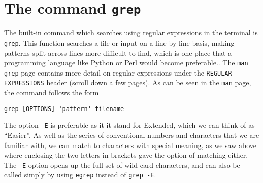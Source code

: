 \section{The command \texttt{grep}}
The built-in command which searches using regular expressions in the terminal is \texttt{grep}.
This function searches a file or input on a line-by-line basis, making patterns split across lines more difficult to find, which is one place that a programming language like Python or Perl would become preferable..  
The \texttt{man grep} page contains more detail on regular expressions under the \texttt{REGULAR EXPRESSIONS} header (scroll down a few pages).  
As can be seen in the \texttt{man} page, the command follows the form
\begin{lstlisting}
grep [OPTIONS] 'pattern' filename
\end{lstlisting}
The option \texttt{-E} is preferable as it it stand for Extended, which we can think of as ``Easier''.
As well as the series of conventional numbers and characters that we are familiar with, we can match to characters with special meaning, as we saw above where enclosing the two letters in brackets gave the option of matching either. 
The \texttt{-E} option opens up the full set of wild-card characters, and can also be called simply by using \texttt{egrep} instead of \texttt{grep -E}.\\

